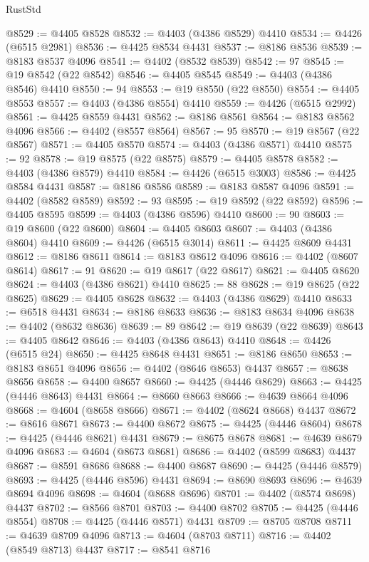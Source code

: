 \begin{lexlean}{RustStd}
\begin{coremodule}
@8529 := @4405 @8528
@8532 := @4403 (@4386 @8529) @4410
@8534 := @4426 (@6515 @2981)
@8536 := @4425 @8534 @4431
@8537 := @8186 @8536
@8539 := @8183 @8537 @4096
@8541 := @4402 (@8532 @8539)
@8542 := 97
@8545 := @19 @8542 (@22 @8542)
@8546 := @4405 @8545
@8549 := @4403 (@4386 @8546) @4410
@8550 := 94
@8553 := @19 @8550 (@22 @8550)
@8554 := @4405 @8553
@8557 := @4403 (@4386 @8554) @4410
@8559 := @4426 (@6515 @2992)
@8561 := @4425 @8559 @4431
@8562 := @8186 @8561
@8564 := @8183 @8562 @4096
@8566 := @4402 (@8557 @8564)
@8567 := 95
@8570 := @19 @8567 (@22 @8567)
@8571 := @4405 @8570
@8574 := @4403 (@4386 @8571) @4410
@8575 := 92
@8578 := @19 @8575 (@22 @8575)
@8579 := @4405 @8578
@8582 := @4403 (@4386 @8579) @4410
@8584 := @4426 (@6515 @3003)
@8586 := @4425 @8584 @4431
@8587 := @8186 @8586
@8589 := @8183 @8587 @4096
@8591 := @4402 (@8582 @8589)
@8592 := 93
@8595 := @19 @8592 (@22 @8592)
@8596 := @4405 @8595
@8599 := @4403 (@4386 @8596) @4410
@8600 := 90
@8603 := @19 @8600 (@22 @8600)
@8604 := @4405 @8603
@8607 := @4403 (@4386 @8604) @4410
@8609 := @4426 (@6515 @3014)
@8611 := @4425 @8609 @4431
@8612 := @8186 @8611
@8614 := @8183 @8612 @4096
@8616 := @4402 (@8607 @8614)
@8617 := 91
@8620 := @19 @8617 (@22 @8617)
@8621 := @4405 @8620
@8624 := @4403 (@4386 @8621) @4410
@8625 := 88
@8628 := @19 @8625 (@22 @8625)
@8629 := @4405 @8628
@8632 := @4403 (@4386 @8629) @4410
@8633 := @6518 @4431
@8634 := @8186 @8633
@8636 := @8183 @8634 @4096
@8638 := @4402 (@8632 @8636)
@8639 := 89
@8642 := @19 @8639 (@22 @8639)
@8643 := @4405 @8642
@8646 := @4403 (@4386 @8643) @4410
@8648 := @4426 (@6515 @24)
@8650 := @4425 @8648 @4431
@8651 := @8186 @8650
@8653 := @8183 @8651 @4096
@8656 := @4402 (@8646 @8653) @4437
@8657 := @8638 @8656
@8658 := @4400 @8657
@8660 := @4425 (@4446 @8629)
@8663 := @4425 (@4446 @8643) @4431
@8664 := @8660 @8663
@8666 := @4639 @8664 @4096
@8668 := @4604 (@8658 @8666)
@8671 := @4402 (@8624 @8668) @4437
@8672 := @8616 @8671
@8673 := @4400 @8672
@8675 := @4425 (@4446 @8604)
@8678 := @4425 (@4446 @8621) @4431
@8679 := @8675 @8678
@8681 := @4639 @8679 @4096
@8683 := @4604 (@8673 @8681)
@8686 := @4402 (@8599 @8683) @4437
@8687 := @8591 @8686
@8688 := @4400 @8687
@8690 := @4425 (@4446 @8579)
@8693 := @4425 (@4446 @8596) @4431
@8694 := @8690 @8693
@8696 := @4639 @8694 @4096
@8698 := @4604 (@8688 @8696)
@8701 := @4402 (@8574 @8698) @4437
@8702 := @8566 @8701
@8703 := @4400 @8702
@8705 := @4425 (@4446 @8554)
@8708 := @4425 (@4446 @8571) @4431
@8709 := @8705 @8708
@8711 := @4639 @8709 @4096
@8713 := @4604 (@8703 @8711)
@8716 := @4402 (@8549 @8713) @4437
@8717 := @8541 @8716

\end{coremodule}
\end{lexlean}
